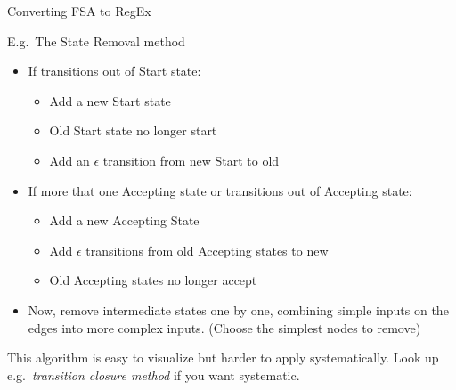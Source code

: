 \documentclass{beamer}
\begin{document}
\begin{frame}{Converting FSA to RegEx}

  E.g.\ The State Removal method
  \begin{itemize}
  \item If transitions out of Start state:
    \begin{itemize}
    \item Add a new Start state
    \item Old Start state no longer start
    \item Add an $\epsilon$ transition from new Start to old
    \end{itemize}
  \item If more that one Accepting state or transitions out of Accepting state:
    \begin{itemize}
    \item Add a new Accepting State
    \item Add $\epsilon$ transitions from old Accepting states to new
    \item Old Accepting states no longer accept
    \end{itemize}
  \item Now, remove intermediate states one by one, combining simple
    inputs on the edges into more complex inputs.  (Choose the
    simplest nodes to remove)
  \end{itemize}

  This algorithm is easy to visualize but harder to apply
  systematically. Look up e.g.\ {\it transition closure method} if you
  want systematic.
\end{frame}
\end{document}
